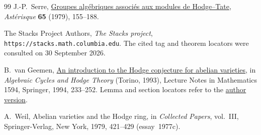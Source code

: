 \documentclass[11pt]{article}
\numberwithin{equation}{section}
\begin{document}
\begin{thebibliography}{99}
J.-P.~Serre,
\href{https://www.numdam.org/item/AST_1979__65__155_0/}{Groupes alg\'ebriques associ\'es aux modules de Hodge--Tate},
\emph{Ast\'erisque} \textbf{65} (1979), 155--188.

The Stacks Project Authors,
\emph{The Stacks project},
\texttt{https://stacks.math.columbia.edu}.
The cited tag and theorem locators were consulted on 30 September 2026.

B.~van Geemen,
\href{https://doi.org/10.1007/978-3-540-49046-3_5}{An introduction to the Hodge conjecture for abelian varieties},
in \emph{Algebraic Cycles and Hodge Theory} (Torino, 1993),
Lecture Notes in Mathematics 1594, Springer, 1994, 233--252.
Lemma and section locators refer to the
\href{https://sites.unimi.it/vangeemen/cime.pdf}{author version}.

A.~Weil,
Abelian varieties and the Hodge ring,
in \emph{Collected Papers}, vol.~III,
Springer-Verlag, New York, 1979, 421--429 (essay~1977c).

\end{thebibliography}
\end{document}
